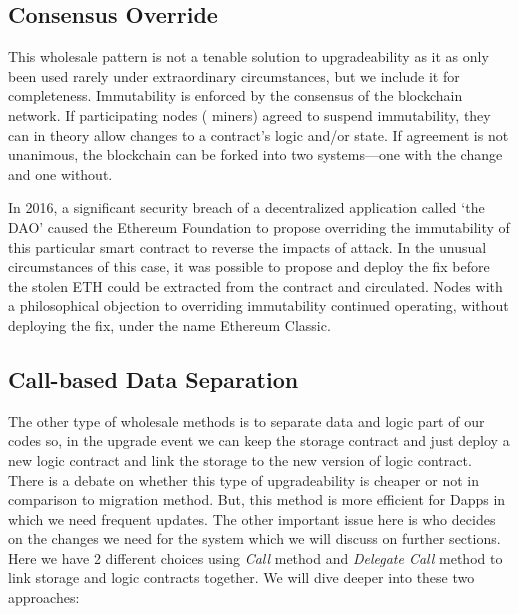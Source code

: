 
\subsection{Consensus Override}
\label{sec:hardfork}

This wholesale pattern is not a tenable solution to upgradeability as it as only been used rarely under extraordinary circumstances, but we include it for completeness. Immutability is enforced by the consensus of the blockchain network. If participating nodes (
\eg miners) agreed to suspend immutability, they can in theory allow changes to a contract's logic and/or state. If agreement is not unanimous, the blockchain can be forked into two systems---one with the change and one without. 

In 2016, a significant security breach of a decentralized application called `the DAO' caused the Ethereum Foundation to propose overriding the immutability of this particular smart contract to reverse the impacts of attack. In the unusual circumstances of this case, it was possible to propose and deploy the fix before the stolen ETH could be extracted from the contract and circulated. Nodes with a philosophical objection to overriding immutability continued operating, without deploying the fix, under the name Ethereum Classic.


\subsection{Call-based Data Separation}



The other type of wholesale methods is to separate data and logic part of our codes so, in the upgrade event we can keep the storage contract and just deploy a new logic contract and link the storage to the new version of logic contract.
There is a debate on whether this type of upgradeability is cheaper or not in comparison to migration method. But, this method is more efficient for Dapps in which we need frequent updates. The other important issue here is who decides on the changes we need for the system which we will discuss on further sections.
Here we have 2 different choices using \textit{Call} method and \textit{Delegate Call} method to link storage and logic contracts together. We will dive deeper into these two approaches:

